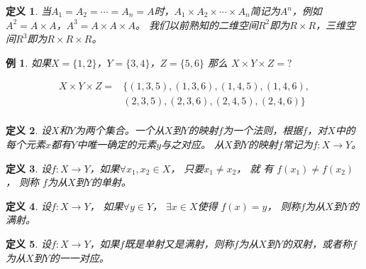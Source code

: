 \documentclass{book}[oneside]
\newtheorem{Def}{定义}[chapter]
\newtheorem*{Example}{例}
\begin{document}
\begin{CJK*}{UTF8}{gbsn}
\begin{Def}
当$A_1=A_2=\cdots=A_n=A$时，$A_1 \times A_2\times \cdots \times A_n$简记为$A^n$，例如$A^2=A\times A$，$A^3=A\times A\times A$。
我们以前熟知的二维空间$R^2$即为$R\times R$，三维空间$R^3$即为$R\times R\times R$。

  \end{Def}
  \begin{Example}

        如果$X=\{1,2\}$，$Y=\{3,4\}$，$Z=\{5,6\}$ 那么 $X \times Y \times Z = ?$
    
     \begin{equation*}
       \begin{split}
        X \times Y \times Z =& \{ (1,3, 5), (1,3, 6), (1, 4, 5), (1, 4, 6), \\
 &(2, 3, 5), (2, 3, 6), (2, 4, 5), (2, 4, 6) \}\\
       \end{split}
     \end{equation*}

  \end{Example}

  \begin{Def}
    设$X$和$Y$为两个集合。一个从$X$到$Y$的映射$f$为一个法则，根据$f$，对$X$中的每个元素$x$都有$Y$中唯一确定的元素$y$与之对应。
    从$X$到$Y$的映射$f$常记为$f:X\to Y$。
  \end{Def}
    \begin{Def}
    设$f:X\to Y$，如果$\forall x_1, x_2 \in X$， 只要$x_1 \neq x_2$，  就 有 $f(x_1) \neq f(x_2)$，   则称 $f$为从$X$到$Y$的单射。
  \end{Def}
  \begin{Def}
    设$f:X\to Y$， 如果$\forall y \in Y$， $\exists x \in X$使得 $f(x) = y$， 则称$f$为从$X$到$Y$的满射。
  \end{Def}
  \begin{Def}
    设$f:X\to Y$，如果$f$既是单射又是满射，则称$f$为从$X$到$Y$的双射，或者称$f$为从$X$到$Y$的一一对应。
  \end{Def}


\end{CJK*}
\end{document}
